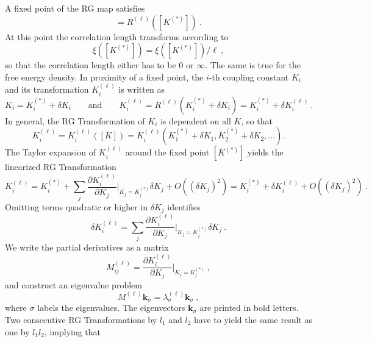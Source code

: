 	A fixed point of the RG	map satisfies
	\begin{equation}
		[K^{(*)}] =	R^{(\ell)}\left([K^{(*)}]\right) ~.
	\end{equation}
	At this point the correlation length transforms according to
	\begin{equation}
		\xi\left([K^{(*)}]\right) =	\xi\left([K^{(*)}]\right) / \ell~,
	\end{equation}
	so that the correlation length either has to be $0$ or $\infty$. The same is true for the free energy density. In proximity of a fixed point, the $i$-th coupling constant $K_i$ and its transformation $K_i^{(\ell)}$ is written as
	\begin{equation}
		K_i =	K_i^{(*)} + \delta K_i \qquad \text{and} \qquad K_i^{(\ell)} =	R^{(\ell)}(K_i^{(*)} + \delta K_i) =	K_i^{(*)} + \delta K_i^{(\ell)}~.
	\end{equation}
	In general, the RG Transformation of $K_i$ is dependent on all $K$, so that
	\begin{equation}
		K^{(\ell)}_i =	K^{(\ell)}_i([K]) =	K^{(\ell)}_i(K_1^{(*)} + \delta K_1, K_2^{(*)} + \delta K_2, ...).
	\end{equation}
	The Taylor expansion of $K_i^{(\ell)}$ around the fixed point $[K^{(*)}]$ yields the linearized RG Transformation
	\begin{equation} \label{Eq::linearized-RG}
		K_i^{(\ell)} =	K_i^{(*)} + \sum_j \frac{\partial K_i^{(\ell)}}{\partial K_j} \bigg |_{K_j = K_j^{(*)}} \delta K_j + O((\delta K_j)^2) = K_i^{(*)} + \delta K_i^{(\ell)} + O((\delta K_j)^2) ~.
	\end{equation}
	Omitting terms quadratic or higher in $\delta K_j$ identifies
	\begin{equation}
		\delta K_i^{(\ell)} =	\sum_j \frac{\partial K_i^{(\ell)}}{\partial K_j} \bigg |_{K_j = K_j^{(*)}} \delta K_j~.
	\end{equation}
	We write the partial derivatives as a matrix
	\begin{equation}
		M^{(\ell)}_{ij} =	\frac{\partial K_i^{(\ell)}}{\partial K_j} \bigg |_{K_j = K_j^{(*)}}~,
	\end{equation}
	and construct an eigenvalue problem
	\begin{equation} \label{ev-problem}
		M^{(\ell)} \boldsymbol{k}_{\sigma} =	\lambda_{\sigma}^{(\ell)} \boldsymbol{k}_{\sigma}~,
	\end{equation}
	where $\sigma$ labels the eigenvalues. The eigenvectors $\boldsymbol{k}_\sigma$ are printed in bold letters.  Two consecutive RG Transformations by $l_1$ and $l_2$ have to yield the same result as one by $l_1l_2$, implying that
